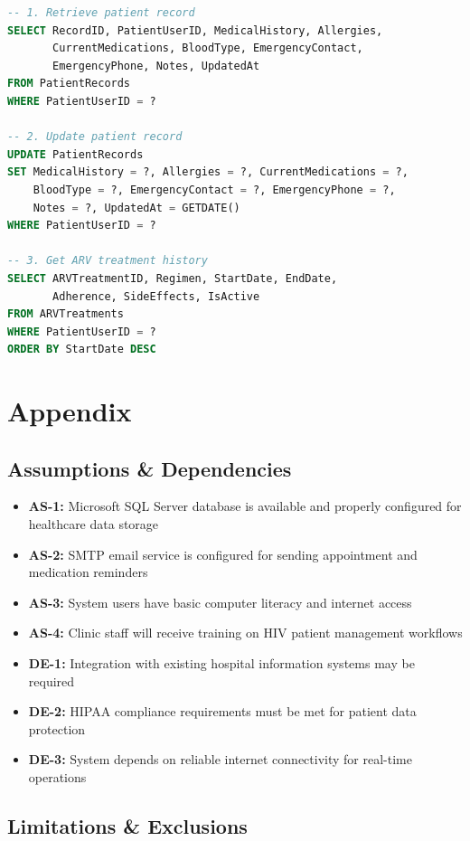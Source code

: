 \documentclass[12pt,a4paper]{article}
\begin{document}
\begin{lstlisting}[language=SQL]
-- 1. Retrieve patient record
SELECT RecordID, PatientUserID, MedicalHistory, Allergies, 
       CurrentMedications, BloodType, EmergencyContact, 
       EmergencyPhone, Notes, UpdatedAt
FROM PatientRecords
WHERE PatientUserID = ?

-- 2. Update patient record
UPDATE PatientRecords
SET MedicalHistory = ?, Allergies = ?, CurrentMedications = ?,
    BloodType = ?, EmergencyContact = ?, EmergencyPhone = ?,
    Notes = ?, UpdatedAt = GETDATE()
WHERE PatientUserID = ?

-- 3. Get ARV treatment history
SELECT ARVTreatmentID, Regimen, StartDate, EndDate, 
       Adherence, SideEffects, IsActive
FROM ARVTreatments
WHERE PatientUserID = ?
ORDER BY StartDate DESC
\end{lstlisting}

\section{Appendix}

\subsection{Assumptions \& Dependencies}

\begin{itemize}
    \item \textbf{AS-1:} Microsoft SQL Server database is available and properly configured for healthcare data storage
    \item \textbf{AS-2:} SMTP email service is configured for sending appointment and medication reminders
    \item \textbf{AS-3:} System users have basic computer literacy and internet access
    \item \textbf{AS-4:} Clinic staff will receive training on HIV patient management workflows
    \item \textbf{DE-1:} Integration with existing hospital information systems may be required
    \item \textbf{DE-2:} HIPAA compliance requirements must be met for patient data protection
    \item \textbf{DE-3:} System depends on reliable internet connectivity for real-time operations
\end{itemize}

\subsection{Limitations \& Exclusions}
\end{document}
